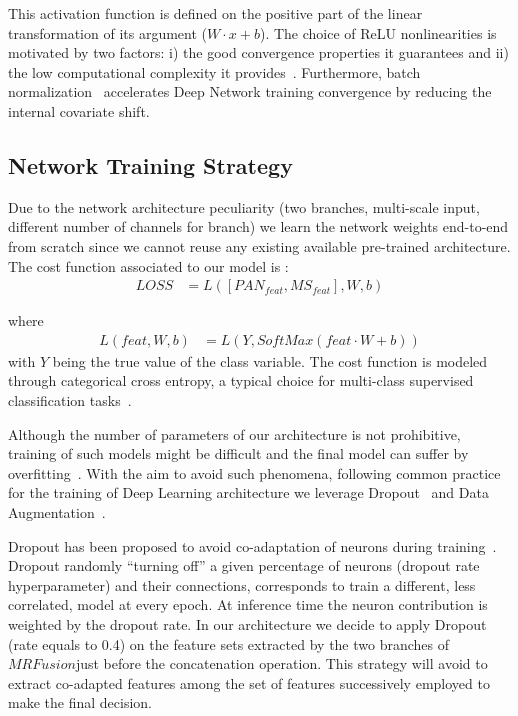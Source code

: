 \documentclass[journal]{IEEEtran}
\newcommand{\method}{$MRFusion$}
\begin{document}
This activation function is defined on the positive part of the linear transformation of its argument ($W \cdot x + b$).  The choice of ReLU nonlinearities is motivated by two factors: i) the good convergence properties it guarantees and ii) the low computational complexity it provides~\cite{NairH10}. Furthermore, batch normalization~\cite{IoffeS15} accelerates Deep Network training convergence by reducing the internal covariate shift.

\subsection{Network Training Strategy }
Due to the network architecture peculiarity (two branches, multi-scale input, different number of channels for branch) we learn the network weights end-to-end from scratch since we cannot reuse any existing available pre-trained architecture.
The cost function associated to our model is :
\begin{align}
LOSS &= L([PAN_{feat}, MS_{feat}], W, b) \label{eqn:cost}
\end{align}

where 
\begin{align}
L(feat, W, b) &= L( Y, SoftMax(feat \cdot W + b)) \nonumber
\end{align}
with $Y$ being the true value of the class variable. 
The cost function is modeled through categorical cross entropy, a typical choice for multi-class supervised classification tasks~\cite{IencoGDM17}.

Although the number of parameters of our architecture is not prohibitive, training of such models might be difficult and the final model can suffer by overfitting~\cite{DahlSH13}. With the aim to avoid such phenomena, following common practice for the training of Deep Learning architecture we leverage Dropout~\cite{DahlSH13} and Data Augmentation~\cite{abs-1712-04621}.

Dropout has been proposed to avoid co-adaptation of neurons during training~\cite{DahlSH13}. Dropout randomly “turning off” a given percentage of neurons (dropout rate hyperparameter) and their connections, corresponds to train a different, less correlated, model at every epoch. At inference time the neuron contribution is weighted by the dropout rate.
In our architecture we decide to apply Dropout (rate equals to 0.4) on the feature sets extracted by the two branches of \method just before the concatenation operation. This strategy will avoid to extract co-adapted features among the set of features successively employed to make the final decision.
\end{document}
